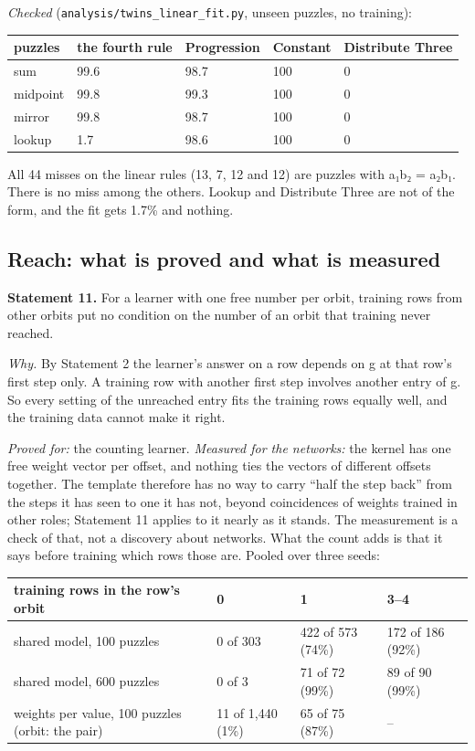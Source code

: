 \emph{Checked} (\texttt{analysis/twins\_linear\_fit.py}, unseen puzzles, no training):

\begin{center}\small
\begin{tabular}{@{}lllll@{}}
\toprule
puzzles & the fourth rule & Progression & Constant & Distribute Three \\
\midrule
sum & 99.6 & 98.7 & 100 & 0 \\
midpoint & 99.8 & 99.3 & 100 & 0 \\
mirror & 99.8 & 98.7 & 100 & 0 \\
lookup & 1.7 & 98.6 & 100 & 0 \\
\bottomrule
\end{tabular}
\end{center}

All 44 misses on the linear rules (13, 7, 12 and 12) are puzzles with a₁b₂ = a₂b₁. There is no miss among the others. Lookup and Distribute Three are not of the form, and the fit gets 1.7\% and nothing.

\subsection{Reach: what is proved and what is measured}\label{sec:3.6.6}

\textbf{Statement 11.} For a learner with one free number per orbit, training rows from other orbits put no condition on the number of an orbit that training never reached.

\emph{Why.} By Statement 2 the learner's answer on a row depends on g at that row's first step only. A training row with another first step involves another entry of g. So every setting of the unreached entry fits the training rows equally well, and the training data cannot make it right.

\emph{Proved for:} the counting learner. \emph{Measured for the networks:} the kernel has one free weight vector per offset, and nothing ties the vectors of different offsets together. The template therefore has no way to carry ``half the step back'' from the steps it has seen to one it has not, beyond coincidences of weights trained in other roles; Statement 11 applies to it nearly as it stands. The measurement is a check of that, not a discovery about networks. What the count adds is that it says before training which rows those are. Pooled over three seeds:

\begin{center}\small
\begin{tabularx}{\linewidth}{@{}Ylll@{}}
\toprule
training rows in the row's orbit & 0 & 1 & 3–4 \\
\midrule
shared model, 100 puzzles & 0 of 303 & 422 of 573 (74\%) & 172 of 186 (92\%) \\
shared model, 600 puzzles & 0 of 3 & 71 of 72 (99\%) & 89 of 90 (99\%) \\
weights per value, 100 puzzles (orbit: the pair) & 11 of 1,440 (1\%) & 65 of 75 (87\%) & – \\
\bottomrule
\end{tabularx}
\end{center}

